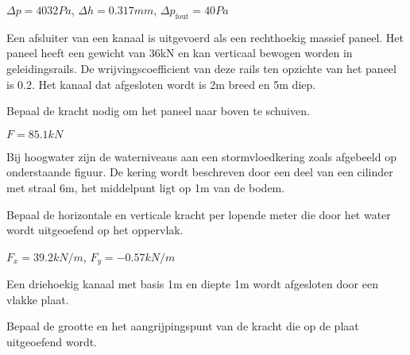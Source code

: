 	\begin{antwoord}
		$\Delta p = \unit{4032}{Pa}$, $\Delta h = \unit{0.317}{mm}$, $\Delta p_{\text{fout}} = \unit{40}{Pa}$
	\end{antwoord}
	\begin{toepassing*}
		\label{wrijvingskracht}
Een afsluiter van een kanaal is uitgevoerd als een rechthoekig massief paneel. Het paneel heeft een gewicht van \unit{36}{kN} en kan verticaal bewogen worden in geleidingsrails. De wrijvingscoefficient van deze rails ten opzichte van het paneel is 0.2. Het kanaal dat afgesloten wordt is 2m breed en 5m diep.
		
Bepaal de kracht nodig om het paneel naar boven te schuiven.
		\begin{center}
		\end{center}
	\end{toepassing*}
	\begin{antwoord}
		$F = \unit{85.1}{kN}$
	\end{antwoord}
	\begin{toepassing*}
		\label{stormvloedkering}
Bij hoogwater zijn de waterniveaus aan een stormvloedkering zoals afgebeeld op onderstaande figuur. De kering wordt beschreven door een deel van een cilinder met straal \unit{6}{m}, het middelpunt ligt op \unit{1}{m} van de bodem.
		
Bepaal de horizontale en verticale kracht per lopende meter die door het water wordt uitgeoefend op het oppervlak.
		\begin{center}
			
		\end{center}
	\end{toepassing*}
	\begin{antwoord}
		$F_x = \unit{39.2}{kN/m}$, $F_y = \unit{-0.57}{kN/m}$
	\end{antwoord}
	\begin{toepassing}
		\label{driehoekig_kanaal}
Een driehoekig kanaal met basis 1m en diepte 1m wordt afgesloten door een vlakke plaat.
		
Bepaal de grootte en het aangrijpingspunt van de kracht die op de plaat uitgeoefend wordt.
		\begin{center}
			
		\end{center}
	\end{toepassing}
